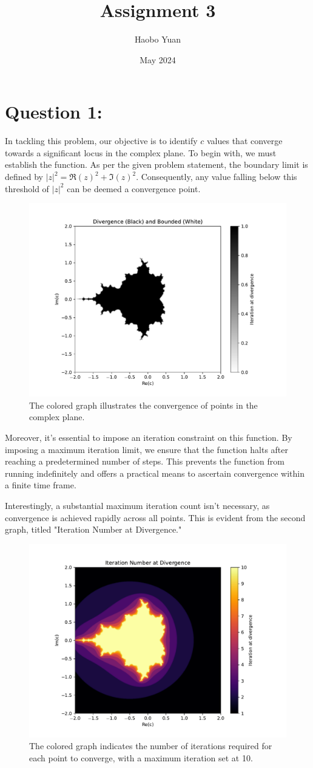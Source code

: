 \documentclass[12pt, letterpaper] {article}
\title{Assignment 3}
\author{Haobo Yuan}
\date{May 2024}
\begin{document}
\maketitle

\section{Question 1:}

In tackling this problem, our objective is to identify \( c \) values that converge towards a significant locus in the complex plane. To begin with, we must establish the function. As per the given problem statement, the boundary limit is defined by \( |z|^2 = \Re(z)^2 + \Im(z)^2 \). Consequently, any value falling below this threshold of \( |z|^2 \) can be deemed a convergence point.

\begin{figure}[h!]
    \centering
    \includegraphics[width=0.5\linewidth, keepaspectratio]{Q1_figure_1.pdf}
    \caption{The colored graph illustrates the convergence of points in the complex plane.}
    \label{fig:Divergence (Black) and Bounded (White)}
\end{figure}

Moreover, it's essential to impose an iteration constraint on this function. By imposing a maximum iteration limit, we ensure that the function halts after reaching a predetermined number of steps. This prevents the function from running indefinitely and offers a practical means to ascertain convergence within a finite time frame.

Interestingly, a substantial maximum iteration count isn't necessary, as convergence is achieved rapidly across all points. This is evident from the second graph, titled "Iteration Number at Divergence."

\begin{figure}[h!]
    \centering
    \includegraphics[width=0.5\linewidth, keepaspectratio]{Q1_figure_2.pdf}
    \caption{The colored graph indicates the number of iterations required for each point to converge, with a maximum iteration set at 10.}
    \label{fig:Iteration Number at Divergence}
\end{figure}
\end{document}

